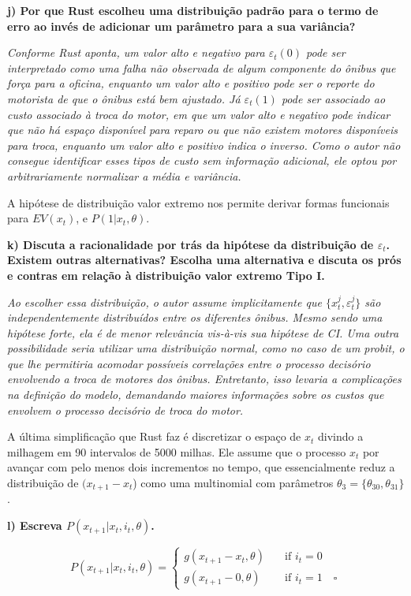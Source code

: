 \documentclass[12pt,a4paper]{article}
\begin{document}
\textbf{j) Por que Rust escolheu uma distribuição padrão para o termo de
erro ao invés de adicionar um parâmetro para a sua variância?}

\emph{Conforme Rust aponta, um valor alto e negativo para
\(\varepsilon_t(0)\) pode ser interpretado como uma falha não observada
de algum componente do ônibus que força para a oficina, enquanto um
valor alto e positivo pode ser o reporte do motorista de que o ônibus
está bem ajustado. Já \(\varepsilon_t(1)\) pode ser associado ao custo
associado à troca do motor, em que um valor alto e negativo pode indicar
que não há espaço disponível para reparo ou que não existem motores
disponíveis para troca, enquanto um valor alto e positivo indica o
inverso. Como o autor não consegue identificar esses tipos de custo sem
informação adicional, ele optou por arbitrariamente normalizar a média e
variância.}

A hipótese de distribuição valor extremo nos permite derivar formas
funcionais para \(EV(x_t)\), e \(P(1 | x_t, \theta)\).

\textbf{k) Discuta a racionalidade por trás da hipótese da distribuição
de \(\varepsilon_t\). Existem outras alternativas? Escolha uma
alternativa e discuta os prós e contras em relação à distribuição valor
extremo Tipo I.}

\emph{Ao escolher essa distribuição, o autor assume implicitamente que
\(\{x_t^j,\varepsilon_t^j\}\) são independentemente distribuídos entre
os diferentes ônibus. Mesmo sendo uma hipótese forte, ela é de menor
relevância vis-à-vis sua hipótese de CI. Uma outra possibilidade seria
utilizar uma distribuição normal, como no caso de um probit, o que lhe
permitiria acomodar possíveis correlações entre o processo decisório
envolvendo a troca de motores dos ônibus. Entretanto, isso levaria a
complicações na definição do modelo, demandando maiores informações
sobre os custos que envolvem o processo decisório de troca do motor.}

A última simplificação que Rust faz é discretizar o espaço de \(x_t\)
divindo a milhagem em 90 intervalos de 5000 milhas. Ele assume que o
processo \(x_t\) por avançar com pelo menos dois incrementos no tempo,
que essencialmente reduz a distribuição de \((x_{t+1} - x_t\)) como uma
multinomial com parâmetros \(\theta_3 = \{\theta_{30}, \theta_{31}\}\).

\textbf{l) Escreva \(P (x_{t+1}| x_t, i_t, \theta)\).}

\[
P (x_{t+1}| x_t, i_t, \theta) =
\begin{cases}
  g(x_{t+1} - x_t,\theta) & \quad \text{if } i_t=0 \\
  g(x_{t+1} - 0,\theta) & \quad \text{if } i_t=1 \quad \square
\end{cases}
\]
\end{document}
